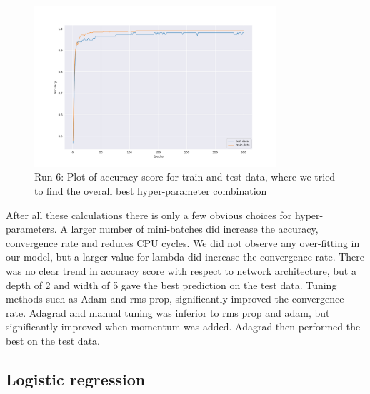 \begin{figure}[H]
    \centering
    \includegraphics[width=0.8\textwidth]{Figures/PartD/d_line_best.png}
    \caption{Run 6: Plot of accuracy score for train and test data, where we
    tried to find the overall best hyper-parameter combination}  
    \label{fig:d_line_best} 
\end{figure}






After all these calculations there is only a few obvious choices for
hyper-parameters. A larger number of mini-batches did increase the accuracy,
convergence rate and reduces CPU cycles. We did not observe any over-fitting in 
our model, but a larger value for lambda did increase the convergence rate.
There was no clear trend in accuracy score with respect to network
architecture, but a depth of 2 and width of 5 gave the best prediction on the
test data. Tuning methods such as Adam and rms prop, significantly improved the
convergence rate. Adagrad and manual tuning was inferior to rms prop and adam,
but significantly improved when momentum was added. Adagrad then performed the
best on the test data. 


                            

\subsection{Logistic regression}





